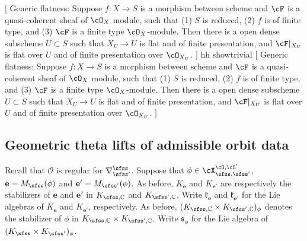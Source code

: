 \documentclass[12pt,a4paper]{amsart}
\newcommand{\trivial}[2][]{\if\relax\detokenize{#1}\relax
  {%
      \color{orange} \vspace{0em} $[$  #2 $]$
      \color{black}
  }
  \else
\ifx#1h
\ifcsname showtrivial\endcsname
{%
    \color{orange} \vspace{0em}  $[$ #2 $]$
    \color{black}
}
\fi
\else {\red Wrong argument!} \fi
\fi
}
\newcommand{\CO}{{\mathcal {O}}}
\numberwithin{equation}{section}
\theoremstyle{remark}
\def\UU{\rU}
\def\bcOp{\overline{\cO'}}
\def\cOp{\cO^{\prime}}
\begin{document}
\trivial[h]{
  Generic flatness: Suppose $f: X\rightarrow S $ is a morphism between scheme
  and $\cF$ is a quasi-coherent sheaf of $\cO_{X}$ module, such that (1) $S$ is
  reduced, (2) $f$ is of finite type, and (3) $\cF$ is a finite type
  $\cO_{X}$-module.
Then there is a open dense subscheme $U\subset S$ such that
$X_{U}\rightarrow U $
is flat and of finite presentation, and $\cF|_{X_U}$ is flat over $U$
and of finite presentation over $\cO_{X_{U}}$.
}

\subsection{Geometric theta lifts of admissible orbit data} 

\def\wedgetop{{\bigwedge}^{\mathrm{top}}}


\medskip

\def\dlift{{\check\vartheta}}
\def\AOD{\mathrm{AOD}}

Recall that  $\CO$ is regular for $\DDss$. Suppose that $\phi\in \CXOO$, $\mathbf e=M_\sfss(\phi)$ and $\mathbf e'=M_{\sfss'}(\phi)$. As before, $K_\mathbf e$ and $K_{\mathbf e'}$ are respectively the  stabilizers of $\mathbf e$ and $\mathbf e'$ in $K_{\sfss, \C}$ and $K_{\sfss', \C}$.  Write $\mathfrak k_{\mathbf e}$ and $\mathfrak k_{\mathbf e'}$ for the Lie algebras of $K_{\mathbf e}$ and $K_{\mathbf e'}$, respectively. As before, $(K_{\sfss, \C}\times K_{\sfss', \C})_{\ww}$ denotes the stabilizer of $\phi$ in $K_{\sfss, \C}\times K_{\sfss', \C}$. 
   Write $\mathfrak s_\phi$ for the Lie algebra of  $(\Ks\times \Ksp)_{\ww}$.
  
\end{document}
